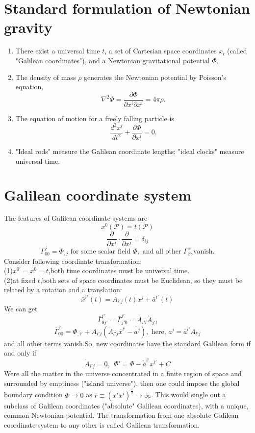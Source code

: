 \section{Standard formulation of Newtonian gravity}
\begin{enumerate}
\item There exist a universal time $t$, a set of Cartesian space coordinates $x_i$ (called "Galilean coordinates"), and a Newtonian gravitational potential $\Phi$.
\item  The density of mass $\rho$ generates the Newtonian potential by Poisson's equation,
\[\nabla^2\Phi = \frac{\partial \Phi}{\partial x^i \partial x^i} = 4\pi\rho.\]
\item  The equation of motion for a freely falling particle is
\[\frac{d^2 x^i}{dt^2} + \frac{\partial \Phi}{\partial x^i} =0 .\]
\item  "Ideal rods" measure the Galilean coordinate lengths; "ideal clocks" measure universal time.
\end{enumerate}

\section{Galilean coordinate system}
\noindent
The features of Galilean coordinate systems are
\[x^0(\mathcal{P}) = t(\mathcal{P})\]
\[\frac{\partial}{\partial x^i} \cdot \frac{\partial}{\partial x^j} = \delta_{ij}\]
\[\Gamma^j_{00} = \Phi_{,j} \mbox{ for some scalar field }\Phi,\mbox{ and all other } \Gamma^{\alpha}_{\beta \gamma} \mbox{vanish.}\]
Consider following coordinate transformation:\\
(1)$x^{0'}=x^0=t$,both time coordinates must be universal time.\\
(2)at fixed $t$,both sets of space coordinates must be Euclidean, so they must be related by a rotation and a translation:
\[\bar{x}^{i'}(t) = A_{i'j}(t)x^j + \bar{a}^{i'}(t)\]
We can get
\[\bar{\Gamma}^{i'}_{0j'} = \bar{\Gamma}^{i'}_{j'0} = A_{i'l}\dot{A}_{j'l}\]
\[\bar{\Gamma}^{i'}_{00} = \Phi_{,i'} + A_{i'j}(\ddot{A}_{l'j}\bar{x}^{l'}-\ddot{a^{j}}), \mbox{   here, }a^{j} = \bar{a}^{l'}A_{l'j}\]
and all other terms vanish.So, new coordinates have the standard Galilean form  if and only if
\[\dot{A}_{i'j}=0,\ \ \Phi'=\Phi-\ddot{\bar{a}}^{i'}x^{i'}+C\]
Were all the matter in the universe concentrated in a finite region of space and surrounded by emptiness ("island universe"), then one could impose the global boundary condition $\Phi \to 0$ as $r \equiv (x^ix^i)^{\frac{1}{2}} \to \infty$. This would single out a subclass of Galilean coordinates ("absolute" Galilean coordinates), with a unique, common Newtonian potential. The transformation from one
absolute Galilean coordinate system to any other is called Galilean transformation.

